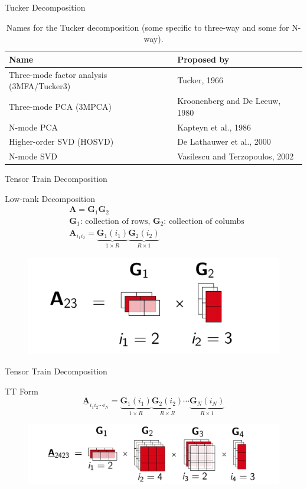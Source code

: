 \documentclass[t, 10pt, handout, aspectratio=169]{beamer}
\begin{document}
\begin{frame}{Tucker Decomposition}
\large
\begin{table}
\begin{tabular}{l | l}
Name & Proposed by \\
\hline \hline
Three-mode factor analysis (3MFA/Tucker3) & Tucker, 1966 \\ 
Three-mode PCA (3MPCA) &  Kroonenberg and De Leeuw, 1980\\
N-mode PCA & Kapteyn et al., 1986 \\
Higher-order SVD (HOSVD)  & De Lathauwer et al., 2000 \\
N-mode SVD & Vasilescu and Terzopoulos, 2002
\end{tabular}
\caption{Names for the Tucker decomposition (some specific to three-way and some for N-way).}
\end{table}
\end{frame}

\begin{frame}{Tensor Train Decomposition}
\large
\begin{block}{Low-rank Decomposition}
$$
\begin{aligned}
&\mathbf{A}=\mathbf{G}_{1}\mathbf{G}_{2}  \\
&\mathbf{G}_{1}\text{: collection of rows, }\mathbf{G}_{2}\text{: collection of columbs}\\
&\mathbf{A}_{i_1i_2}=\underbrace{\mathbf{G}_1(i_1)}_{1\times R}\underbrace{\mathbf{G}_2(i_2)}_{R\times 1}
\end{aligned}
$$
\end{block}
\begin{figure}
	\centering  
	\includegraphics[width=0.45\linewidth]{figs/tt_lowrank.png}
	\label{fig:tt_lowrank}
\end{figure}
\end{frame}

\begin{frame}{Tensor Train Decomposition}
\large
\begin{block}{TT Form}
$$
\underline{\mathbf{A}}_{i_1i_2\cdots i_N}=\underbrace{\mathbf{G}_{1}(i_1)}_{1\times R}\underbrace{\mathbf{G}_{2}(i_2)}_{R\times R}\cdots\underbrace{\mathbf{G}_{N}(i_N)}_{R\times 1}
$$
\end{block}
\begin{figure}
	\centering  
	\includegraphics[width=0.9\linewidth]{figs/tt_form_example.png}
	\label{fig:tt_form_example}
\end{figure}
\end{frame}
\end{document}

